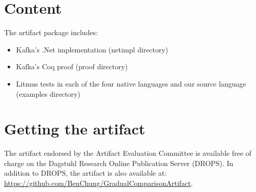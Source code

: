 \documentclass[a4paper,UKenglish]{darts-v2018}
\newenvironment{content}{\section{Content}}{}
\newenvironment{getting}{\section{Getting the artifact} The artifact 
endorsed by the Artifact Evaluation Committee is available free of 
charge on the Dagstuhl Research Online Publication Server (DROPS).}{}
\begin{document}
\begin{content}
The artifact package includes:
\begin{itemize}
\item Kafka's .Net implementation (netimpl directory)
\item Kafka's Coq proof (proof directory)
\item Litmus tests in each of the four native languages and our source language (examples directory)
\end{itemize}
\end{content}

\begin{getting}
In addition to DROPS, the artifact is also available at:
\url{https://github.com/BenChung/GradualComparisonArtifact}.
\end{getting}
\end{document}
